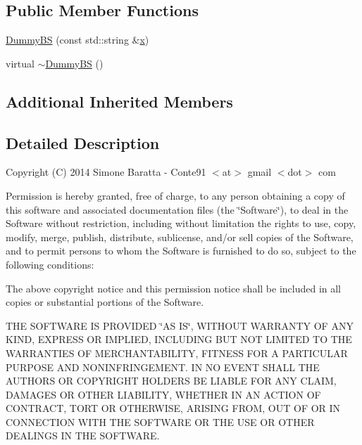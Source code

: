 \subsection*{Public Member Functions}
\begin{DoxyCompactItemize}
\item 
\hyperlink{class_dummy_b_s_a7983de3554dbab88dc4053a2b657dc5d}{Dummy\+B\+S} (const std\+::string \&\hyperlink{jquery_8js_a4c3eadaa5164016d2c340d495fc6e55e}{x})
\item 
virtual \hyperlink{class_dummy_b_s_a7a15f04bc2f52b3e8763160fb4e466c1}{$\sim$\+Dummy\+B\+S} ()
\end{DoxyCompactItemize}
\subsection*{Additional Inherited Members}


\subsection{Detailed Description}
Copyright (C) 2014 Simone Baratta -\/ Conte91 $<$at$>$ gmail $<$dot$>$ com

Permission is hereby granted, free of charge, to any person obtaining a copy of this software and associated documentation files (the \char`\"{}\+Software\char`\"{}), to deal in the Software without restriction, including without limitation the rights to use, copy, modify, merge, publish, distribute, sublicense, and/or sell copies of the Software, and to permit persons to whom the Software is furnished to do so, subject to the following conditions\+:

The above copyright notice and this permission notice shall be included in all copies or substantial portions of the Software.

T\+H\+E S\+O\+F\+T\+W\+A\+R\+E I\+S P\+R\+O\+V\+I\+D\+E\+D \char`\"{}\+A\+S I\+S\char`\"{}, W\+I\+T\+H\+O\+U\+T W\+A\+R\+R\+A\+N\+T\+Y O\+F A\+N\+Y K\+I\+N\+D, E\+X\+P\+R\+E\+S\+S O\+R I\+M\+P\+L\+I\+E\+D, I\+N\+C\+L\+U\+D\+I\+N\+G B\+U\+T N\+O\+T L\+I\+M\+I\+T\+E\+D T\+O T\+H\+E W\+A\+R\+R\+A\+N\+T\+I\+E\+S O\+F M\+E\+R\+C\+H\+A\+N\+T\+A\+B\+I\+L\+I\+T\+Y, F\+I\+T\+N\+E\+S\+S F\+O\+R A P\+A\+R\+T\+I\+C\+U\+L\+A\+R P\+U\+R\+P\+O\+S\+E A\+N\+D N\+O\+N\+I\+N\+F\+R\+I\+N\+G\+E\+M\+E\+N\+T. I\+N N\+O E\+V\+E\+N\+T S\+H\+A\+L\+L T\+H\+E A\+U\+T\+H\+O\+R\+S O\+R C\+O\+P\+Y\+R\+I\+G\+H\+T H\+O\+L\+D\+E\+R\+S B\+E L\+I\+A\+B\+L\+E F\+O\+R A\+N\+Y C\+L\+A\+I\+M, D\+A\+M\+A\+G\+E\+S O\+R O\+T\+H\+E\+R L\+I\+A\+B\+I\+L\+I\+T\+Y, W\+H\+E\+T\+H\+E\+R I\+N A\+N A\+C\+T\+I\+O\+N O\+F C\+O\+N\+T\+R\+A\+C\+T, T\+O\+R\+T O\+R O\+T\+H\+E\+R\+W\+I\+S\+E, A\+R\+I\+S\+I\+N\+G F\+R\+O\+M, O\+U\+T O\+F O\+R I\+N C\+O\+N\+N\+E\+C\+T\+I\+O\+N W\+I\+T\+H T\+H\+E S\+O\+F\+T\+W\+A\+R\+E O\+R T\+H\+E U\+S\+E O\+R O\+T\+H\+E\+R D\+E\+A\+L\+I\+N\+G\+S I\+N T\+H\+E S\+O\+F\+T\+W\+A\+R\+E. 

